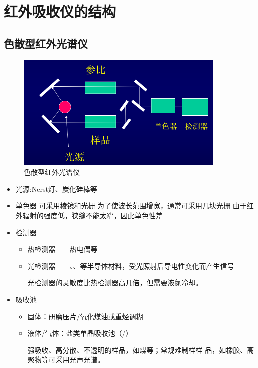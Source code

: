 \section{红外吸收仪的结构}
\subsection{色散型红外光谱仪}
\begin{figure}[ht]
    \centering
    \includegraphics[width=10cm]{image/chp5_ord_ins.png}
    \caption{色散型红外光谱仪}
    \label{fig:ordin_ins}
\end{figure}
\begin{itemize}
    \item 光源:Nerst灯、炭化硅棒等
    \item 单色器
可采用棱镜和光栅
为了使波长范围增宽，通常可采用几块光栅
由于红外辐射的强度低，狭缝不能太窄，因此单色性差
    \item 检测器
    \begin{itemize}
        \item 热检测器——热电偶等
        \item 光检测器——、、等半导体材料，受光照射后导电性变化而产生信号
        \begin{note}
            光检测器的灵敏度比热检测器高几倍，但需要液氮冷却。
        \end{note}
    \end{itemize}
    \item  吸收池
    \begin{itemize}
        \item 固体：研磨压片/氧化煤油或重烃调糊
        \item 液体/气体：盐类单晶吸收池（/）
        \begin{note}
强吸收、高分散、不透明的样品，如煤等；常规难制样样
品，如橡胶、高聚物等可采用光声光谱。
        \end{note}
    \end{itemize}

		   
\end{itemize}
